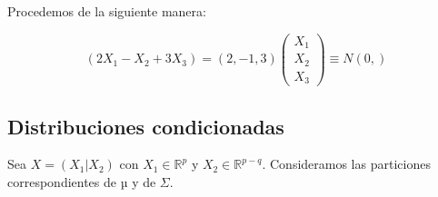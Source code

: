 \documentclass[nochap]{apuntes}
\begin{document}
Procedemos de la siguiente manera:

\[
(2X_1-X_2+3X_3)=(2,-1,3)\left(
\begin{array}{c}
X_1\\
X_2\\
X_3
\end{array}
\right)\equiv
N\left( 0,  \right)
\]



\subsection{Distribuciones condicionadas}

\begin{prop}

Sea $X=(X_1|X_2)$ con $X_1∈ℝ^p$ y $X_2∈ℝ^{p-q}$. Consideramos las particiones correspondientes de $µ$ y de $\Sigma$.

\end{prop}
\end{document}
